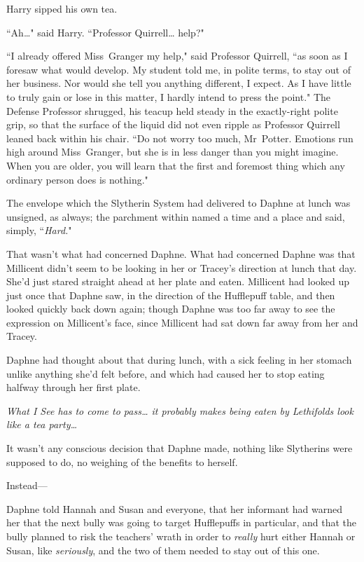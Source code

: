 Harry sipped his own tea.

``Ah{\ldots}" said Harry. ``Professor Quirrell{\ldots} help?"

``I already offered Miss~Granger my help," said Professor Quirrell, ``as soon as I foresaw what would develop. My student told me, in polite terms, to stay out of her business. Nor would she tell you anything different, I expect. As I have little to truly gain or lose in this matter, I hardly intend to press the point." The Defense Professor shrugged, his teacup held steady in the exactly-right polite grip, so that the surface of the liquid did not even ripple as Professor Quirrell leaned back within his chair. ``Do not worry too much, Mr~Potter. Emotions run high around Miss~Granger, but she is in less danger than you might imagine. When you are older, you will learn that the first and foremost thing which any ordinary person does is nothing."

\later

The envelope which the Slytherin System had delivered to Daphne at lunch was unsigned, as always; the parchment within named a time and a place and said, simply, ``\emph{Hard.}"

That wasn't what had concerned Daphne. What had concerned Daphne was that Millicent didn't seem to be looking in her or Tracey's direction at lunch that day. She'd just stared straight ahead at her plate and eaten. Millicent had looked up just once that Daphne saw, in the direction of the Hufflepuff table, and then looked quickly back down again; though Daphne was too far away to see the expression on Millicent's face, since Millicent had sat down far away from her and Tracey.

Daphne had thought about that during lunch, with a sick feeling in her stomach unlike anything she'd felt before, and which had caused her to stop eating halfway through her first plate.

\emph{What I See has to come to pass{\ldots} it probably makes being eaten by Lethifolds look like a tea party{\ldots}}

It wasn't any conscious decision that Daphne made, nothing like Slytherins were supposed to do, no weighing of the benefits to herself.

Instead—

Daphne told Hannah and Susan and everyone, that her informant had warned her that the next bully was going to target Hufflepuffs in particular, and that the bully planned to risk the teachers' wrath in order to \emph{really} hurt either Hannah or Susan, like \emph{seriously}, and the two of them needed to stay out of this one.


